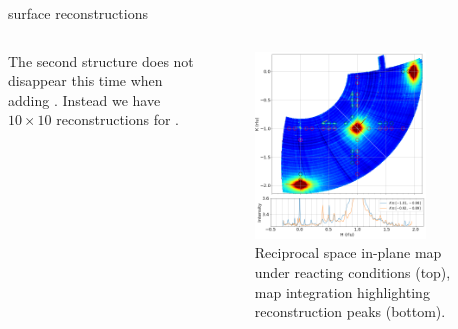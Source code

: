 \begin{frame}{\ptthreeofour surface reconstructions}
\begin{columns}


    The second structure does not disappear this time when adding \ammonia. Instead we have $10\times10$ reconstructions for \ptthreeofour.


    \begin{figure}
        \centering
        \includegraphics[width=0.79\textwidth]{Figures/sxrd_data/maps/band_in_k_reconstructions.png}
        \caption{Reciprocal space in-plane map under reacting conditions (top), map integration highlighting reconstruction peaks (bottom).}
        \label{fig:CondE2}
    \end{figure}
    \end{columns}
    
\end{frame}